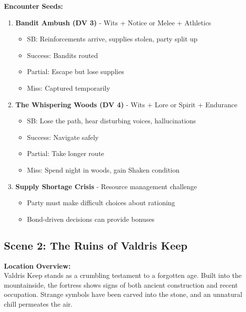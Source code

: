 \documentclass[11pt]{article}
\begin{document}
\textbf{Encounter Seeds:}
\begin{enumerate}[leftmargin=*]
\item \textbf{Bandit Ambush (DV 3)} - Wits + Notice or Melee + Athletics
\begin{itemize}
\item SB: Reinforcements arrive, supplies stolen, party split up
\item Success: Bandits routed
\item Partial: Escape but lose supplies
\item Miss: Captured temporarily
\end{itemize}

\item \textbf{The Whispering Woods (DV 4)} - Wits + Lore or Spirit + Endurance
\begin{itemize}
\item SB: Lose the path, hear disturbing voices, hallucinations
\item Success: Navigate safely
\item Partial: Take longer route
\item Miss: Spend night in woods, gain Shaken condition
\end{itemize}

\item \textbf{Supply Shortage Crisis} - Resource management challenge
\begin{itemize}
\item Party must make difficult choices about rationing
\item Bond-driven decisions can provide bonuses
\end{itemize}
\end{enumerate}

\subsection*{Scene 2: The Ruins of Valdris Keep}
\textbf{Location Overview:}\\
Valdris Keep stands as a crumbling testament to a forgotten age. Built into the mountainside, the fortress shows signs of both ancient construction and recent occupation. Strange symbols have been carved into the stone, and an unnatural chill permeates the air.
\end{document}
